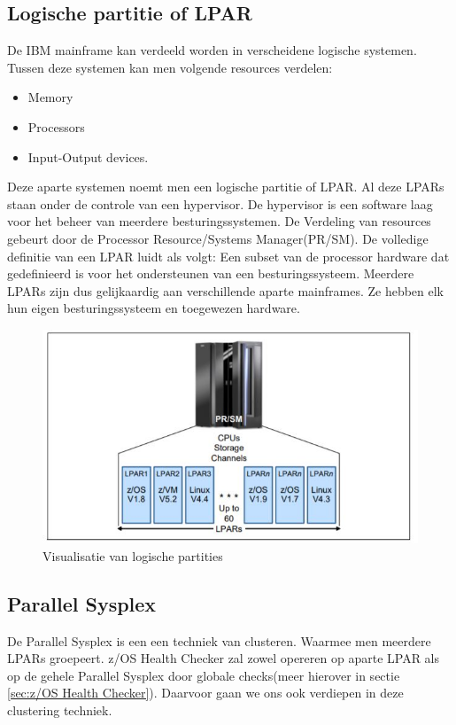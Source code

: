 \subsection{Logische partitie of LPAR}
\label{subsec:Logische partitie of LPAR}
De IBM mainframe kan verdeeld worden in verscheidene logische systemen. Tussen deze systemen kan men volgende resources verdelen:
\begin{itemize}
	\item Memory
	\item Processors
	\item Input-Output devices.
\end{itemize}
Deze aparte systemen noemt men een logische partitie of LPAR. Al deze LPARs staan onder de controle van een hypervisor. De hypervisor is een software laag voor het beheer van meerdere besturingssystemen. De Verdeling van resources gebeurt door de Processor Resource/Systems Manager(PR/SM). De volledige definitie van een LPAR luidt als volgt: Een subset van de processor hardware dat gedefinieerd is voor het ondersteunen van een besturingssysteem. Meerdere LPARs zijn dus gelijkaardig aan verschillende aparte mainframes. Ze hebben elk hun eigen besturingssysteem en toegewezen hardware. \cite{Ebbers2011}

\begin{figure}[h]
	\centering
	\includegraphics{img/LPAR}
	\caption[Logische Partities]{Visualisatie van logische partities}
	\label{fig:lpar}
\end{figure}


\subsection{Parallel Sysplex}
\label{subsec:Parallel Sysplex}

De Parallel Sysplex is een een techniek van clusteren. Waarmee men meerdere LPARs groepeert.  z/OS Health Checker zal zowel opereren op aparte LPAR als op de gehele Parallel Sysplex door globale checks(meer hierover in sectie \ref{sec:z/OS Health Checker}). Daarvoor gaan we ons ook verdiepen in deze clustering techniek.

